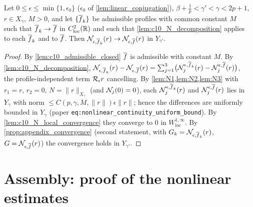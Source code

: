 \begin{proposition}
  \label{prop:nonlinear_continuity}
  Let $0\le\epsilon\le\min\{1,\epsilon_0\}$ ($\epsilon_0$ of \cref{lem:linear_conjugation}),
  $\beta+\frac1p<\gamma'<\gamma<2p+1$, $r\in X_\gamma$, $M>0$, and let $\{\overline{f}_k\}$ be admissible profiles
  with common constant $M$ such that $\overline{f}_k\to\overline{f}$ in $C^2_{\mathrm{loc}}(\mathbb{R})$ and such that
  \cref{lem:c10_N_decomposition} applies to each $\overline{f}_k$ and to $\overline{f}$. Then
  $\mathcal{N}_{\epsilon,\overline{f}_k}(r)\to\mathcal{N}_{\epsilon,\overline{f}}(r)$ in $Y_{\gamma'}$.
\end{proposition}
\begin{proof}
  By \cref{lem:c10_admissible_closed} $\overline{f}$ is admissible with constant $M$. By
  \cref{lem:c10_N_decomposition},
  $\mathcal{N}_{\epsilon,\overline{f}_k}(r)-\mathcal{N}_{\epsilon,\overline{f}}(r)=\sum_{j=1}^3\bigl(\mathcal{N}_j^{\epsilon,\overline{f}_k}(r)-\mathcal{N}_j^{\epsilon,\overline{f}}(r)\bigr)$,
  the profile-independent term $\mathcal{R}_\epsilon r$ cancelling. By \cref{lem:N1,lem:N2,lem:N3} with $r_1=r$,
  $r_2=0$, $N=\|r\|_{X_\gamma}$ (and $\mathcal{N}_j(0)=0$), each $\mathcal{N}_j^{\epsilon,\overline{f}_k}(r)$ and
  $\mathcal{N}_j^{\epsilon,\overline{f}}(r)$ lies in $Y_\gamma$ with norm $\le C(p,\gamma,M,\|r\|)\epsilon\|r\|$; hence the differences
  are uniformly bounded in $Y_\gamma$ (paper \texttt{eq:nonlinear\_continuity\_uniform\_bound}). By
  \cref{lem:c10_N_local_convergence} they converge to $0$ in $W^{1,\infty}_{\mathrm{loc}}$. By
  \cref{prop:appendix_convergence} (second statement, with $G_k=\mathcal{N}_{\epsilon,\overline{f}_k}(r)$, $G=\mathcal{N}_{\epsilon,\overline{f}}(r)$)
  the convergence holds in $Y_{\gamma'}$.
\end{proof}

\section{Assembly: proof of the nonlinear estimates}

